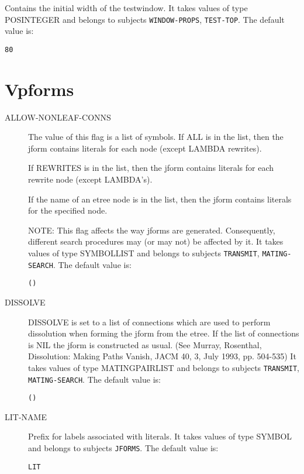 \begin{description}
\item[TESTWIN-WIDTH]  
Contains the initial width of the testwindow.
It takes values of type POSINTEGER and belongs to subjects \texttt{WINDOW-PROPS}, \texttt{TEST-TOP}.  The default value is: \begin{lstlisting}
80
\end{lstlisting}

\item
\end{description}

\section{Vpforms}

\begin{description} 
\item[ALLOW-NONLEAF-CONNS]  
The value of this flag is a list of symbols.
If ALL is in the list, then the jform contains literals for each node
(except LAMBDA rewrites).

If REWRITES is in the list, then the jform contains literals
for each rewrite node (except LAMBDA's).

If the name of an etree node is in the list, then the jform contains literals
for the specified node.

NOTE:  This flag affects the way jforms are generated.  Consequently,
different search procedures may (or may not) be affected by it.
It takes values of type SYMBOLLIST and belongs to subjects \texttt{TRANSMIT}, \texttt{MATING-SEARCH}.  The default value is: \begin{lstlisting}
()
\end{lstlisting}

\item[DISSOLVE]  
DISSOLVE is set to a list of connections which are used to perform dissolution
when forming the jform from the etree.  If the list of connections is NIL the jform
is constructed as usual.
(See Murray, Rosenthal, Dissolution: Making Paths Vanish, JACM 40, 3, July 1993, pp. 504-535)
It takes values of type MATINGPAIRLIST and belongs to subjects \texttt{TRANSMIT}, \texttt{MATING-SEARCH}.  The default value is: \begin{lstlisting}
()
\end{lstlisting}

\item[LIT-NAME]  
Prefix for labels associated with literals.
It takes values of type SYMBOL and belongs to subjects \texttt{JFORMS}.  The default value is: \begin{lstlisting}
LIT
\end{lstlisting}


\end{description}
